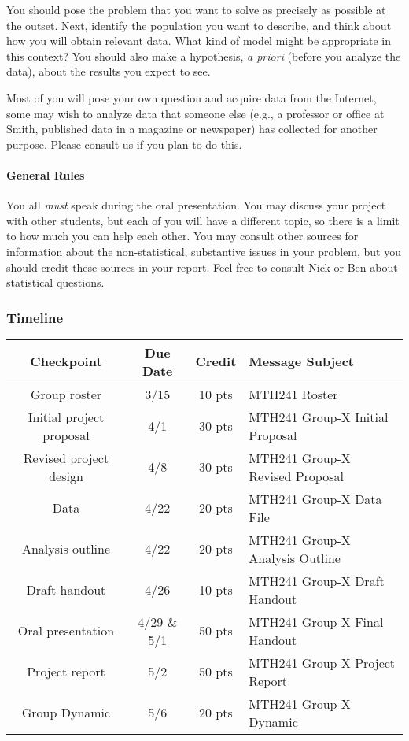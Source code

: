 \documentclass[10pt]{article}
\begin{document}
	You should pose the problem that you want to solve as precisely as possible at the outset. Next, identify the population you want to describe, and think about how you will obtain relevant data. What kind of model might be appropriate in this context? You should also make a hypothesis, \emph{a priori} (before you analyze the data), about the results you expect to see.

	Most of you will pose your own question and acquire data from the Internet, some may wish to analyze data that someone else (e.g., a professor or office at Smith, published data in a magazine or newspaper) has collected for another purpose. Please consult us if you plan to do this.
	
\paragraph{General Rules}
You all \emph{must} speak during the oral presentation. You may discuss your project with other students, but each of you will have a different topic, so there is a limit to how much you can help each other. You may consult other sources for information about the non-statistical, substantive issues in your problem, but you should credit these sources in your report. Feel free to consult Nick or Ben about statistical questions.

\subsubsection*{Timeline}

\begin{table}
	\centering
\begin{tabular}{cccl}
	Checkpoint		&	Due Date		&	Credit	&	Message Subject \\
	\hline
	Group roster		& 3/15 &	 10 pts	& MTH241 Roster \\
	Initial project proposal	& 4/1 	& 30 pts 	& MTH241 Group-X Initial Proposal \\
	Revised project design	& 4/8	& 30 pts	 	& MTH241 Group-X Revised Proposal \\
	Data & 4/22	& 20 pts	& MTH241 Group-X Data File \\
	Analysis outline	& 4/22 & 20 pts	& MTH241 Group-X Analysis Outline \\
	Draft handout & 4/26 	& 10 pts	& MTH241 Group-X Draft Handout \\
	Oral presentation	& 4/29 \& 5/1	& 50 pts		& MTH241 Group-X Final Handout \\
	Project report & 5/2	& 50 pts	& MTH241 Group-X Project Report \\
	Group Dynamic	& 5/6	& 20 pts	& MTH241 Group-X Dynamic \\
	\hline
\end{tabular}
\end{table}
\end{document}
